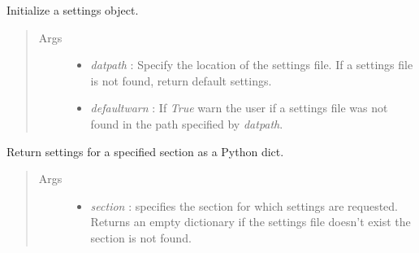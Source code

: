 \documentclass[letterpaper,10pt,english]{sphinxmanual}
\begin{document}
\begin{fulllineitems}
\label{api-doc/mosaic.misc:mosaic.settings.settings}
Initialize a settings object.
\begin{quote}\begin{description}
\item[{Args}] \leavevmode\begin{itemize}
\item {} 
\emph{datpath} :   Specify the location of the settings file. If a settings file is not found, return default settings.

\item {} 
\emph{defaultwarn} :       If \emph{True} warn the user if a settings file was not found in the path specified by \emph{datpath}.

\end{itemize}

\end{description}\end{quote}

\begin{fulllineitems}
\label{api-doc/mosaic.misc:mosaic.settings.settings.getSettings}
Return settings for a specified section as a Python dict.
\begin{quote}\begin{description}
\item[{Args}] \leavevmode\begin{itemize}
\item {} 
\emph{section} :   specifies the section for which settings are requested. Returns an empty dictionary if the settings file doesn't exist the section is not found.

\end{itemize}

\end{description}\end{quote}

\end{fulllineitems}


\end{fulllineitems}
\end{document}
